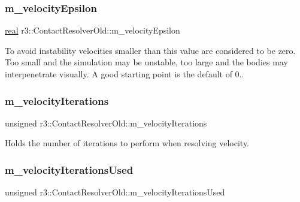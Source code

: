 \subsubsection{\texorpdfstring{m\+\_\+velocity\+Epsilon}{m\_velocityEpsilon}}
{\footnotesize\ttfamily \mbox{\hyperlink{namespacer3_ab2016b3e3f743fb735afce242f0dc1eb}{real}} r3\+::\+Contact\+Resolver\+Old\+::m\+\_\+velocity\+Epsilon\hspace{0.3cm}{\ttfamily [protected]}}

To avoid instability velocities smaller than this value are considered to be zero. Too small and the simulation may be unstable, too large and the bodies may interpenetrate visually. A good starting point is the default of 0.. \mbox{\label{classr3_1_1_contact_resolver_old_ac2829b208a21c2cb3902cee603e07bdd}} 
\subsubsection{\texorpdfstring{m\+\_\+velocity\+Iterations}{m\_velocityIterations}}
{\footnotesize\ttfamily unsigned r3\+::\+Contact\+Resolver\+Old\+::m\+\_\+velocity\+Iterations\hspace{0.3cm}{\ttfamily [protected]}}

Holds the number of iterations to perform when resolving velocity. \mbox{\label{classr3_1_1_contact_resolver_old_ac93418569aaadc1fed711b9d7902ac56}} 
\subsubsection{\texorpdfstring{m\+\_\+velocity\+Iterations\+Used}{m\_velocityIterationsUsed}}
{\footnotesize\ttfamily unsigned r3\+::\+Contact\+Resolver\+Old\+::m\+\_\+velocity\+Iterations\+Used\hspace{0.3cm}{\ttfamily [protected]}}


